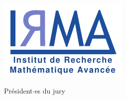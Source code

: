 {\begin{minipage}[c]{6in}
\begin{minipage}[c]{1.5in}
    \end{minipage}
    \hfill
    \begin{minipage}[c]{1.5in}
        \includegraphics[width=\linewidth]{logos/logo-irma.pdf}
    \end{minipage}
    \hfill
\end{minipage}
%
\hfill
%
\begin{minipage}[c]{2.8in}
    \sigskip \signature{}{\vspace{3pt}Président$\cdot$es du jury}
\end{minipage}}